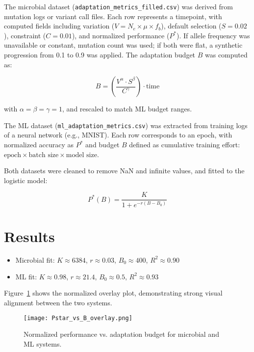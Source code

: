 \documentclass[11pt]{article}
\begin{document}
	The microbial dataset (\texttt{adaptation\_metrics\_filled.csv}) was derived from mutation logs or variant call files. Each row represents a timepoint, with computed fields including variation ($V = N_e \times \mu \times f_b$), default selection ($S = 0.02$), constraint ($C = 0.01$), and normalized performance ($P^*$). If allele frequency was unavailable or constant, mutation count was used; if both were flat, a synthetic progression from 0.1 to 0.9 was applied. The adaptation budget $B$ was computed as:
	
	
	
	\[
	B = \left( \frac{V^\alpha \cdot S^\beta}{C^\gamma} \right) \cdot \text{time}
	\]
	
	
	
	with $\alpha = \beta = \gamma = 1$, and rescaled to match ML budget ranges.
	
	The ML dataset (\texttt{ml\_adaptation\_metrics.csv}) was extracted from training logs of a neural network (e.g., MNIST). Each row corresponds to an epoch, with normalized accuracy as $P^*$ and budget $B$ defined as cumulative training effort: $\text{epoch} \times \text{batch size} \times \text{model size}$.
	
	Both datasets were cleaned to remove NaN and infinite values, and fitted to the logistic model:
	
	
	
	\[
	P^*(B) = \frac{K}{1 + e^{-r(B - B_0)}}
	\]
	
	
	
	
	\section{Results}
	\begin{itemize}
		\item Microbial fit: \(K \approx 6384\), \(r \approx 0.03\), \(B_0 \approx 400\), \(R^2 \approx 0.90\)
		\item ML fit: \(K \approx 0.98\), \(r \approx 21.4\), \(B_0 \approx 0.5\), \(R^2 \approx 0.93\)
	\end{itemize}
	
	Figure~\ref{fig:overlay} shows the normalized overlay plot, demonstrating strong visual alignment between the two systems.
	
	\begin{figure}[h]
		\centering
		\texttt{[image: Pstar\_vs\_B\_overlay.png]}
		\caption{Normalized performance vs. adaptation budget for microbial and ML systems.}
		\label{fig:overlay}
	\end{figure}
	
\end{document}
